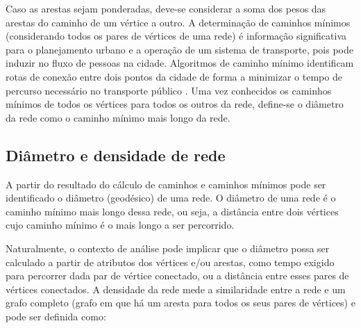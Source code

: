 Caso as arestas sejam ponderadas, deve-se considerar a soma dos pesos das arestas do caminho de um vértice a outro. A determinação de caminhos mínimos (considerando todos os pares de vértices de uma rede) é informação significativa para o planejamento urbano e a operação de um sistema de transporte, pois pode induzir no fluxo de pessoas na cidade. Algoritmos de caminho mínimo identificam rotas de conexão entre dois pontos da cidade de forma a minimizar o tempo de percurso necessário no transporte público \cite{Mart:2009, Larson:81}. Uma vez conhecidos os caminhos mínimos de todos os vértices para todos os outros da rede, define-se o diâmetro da rede como o caminho mínimo mais longo da rede.



\subsection{Diâmetro e densidade de rede}

A partir do resultado do cálculo de caminhos e caminhos mínimos pode ser identificado o diâmetro (geodésico) de uma rede. O diâmetro de uma rede é o caminho mínimo mais longo dessa rede, ou seja, a distância entre dois vértices cujo caminho mínimo é o mais longo a ser percorrido. 

Naturalmente, o contexto de análise pode implicar que o diâmetro possa ser calculado a partir de atributos dos vértices e/ou arestas, como tempo exigido para percorrer dada par de vértice conectado, ou a distância entre esses pares de vértices conectados.
A densidade da rede mede a similaridade entre a rede e um grafo completo (grafo em que há um aresta para todos os seus pares de vértices) e pode ser definida como:

